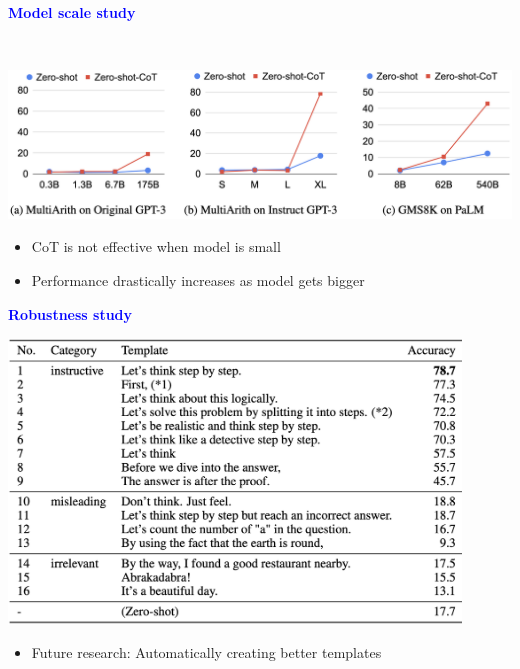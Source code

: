 \documentclass[professionalfont]{beamer}
\begin{document}
\begin{frame}
\begin{center}
    { \textbf{\textcolor{blue}{ {\fontsize{12}{14}\selectfont Model scale study} }} }
\end{center}
\\[0.5cm]

\begin{center}
    \includegraphics[width=1.0\textwidth]{figure/3.png}
\end{center}

{\fontsize{10}{14}\selectfont 
\begin{itemize}
    \item CoT is not effective when model is small

    \item Performance drastically increases as model gets bigger

\end{itemize}
}

\end{frame}

\begin{frame}
\begin{center}
    { \textbf{\textcolor{blue}{ {\fontsize{12}{14}\selectfont Robustness study} }} }
\end{center}

\begin{center}
    \includegraphics[width=0.9\textwidth]{table/4.png}
\end{center}

{\fontsize{10}{14}\selectfont 
\begin{itemize}
    \item Future research: Automatically creating better templates

\end{itemize}
}

\end{frame}
\end{document}
